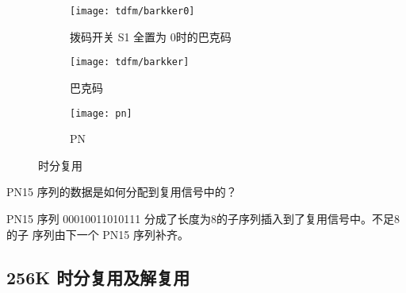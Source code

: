 \documentclass[../main]{subfiles}
\begin{document}
\begin{figure}[htbp]
  \centering
  \begin{subfigure}[htbp]{0.45\linewidth}
    \centering
    \texttt{[image: tdfm/barkker0]}
    \caption{拨码开关 S1 全置为 0时的巴克码}%
    \label{fig:tdfm/barkker0}
  \end{subfigure}
  \quad
  \begin{subfigure}[htbp]{0.45\linewidth}
    \centering
    \texttt{[image: tdfm/barkker]}
    \caption{巴克码}%
    \label{fig:tdfm/barkker}
  \end{subfigure}

  \begin{subfigure}[htbp]{0.45\linewidth}
    \centering
    \texttt{[image: pn]}
    \caption{PN}%
    \label{fig:pn}
  \end{subfigure}
  \caption{时分复用}%
  \label{fig:tdfm}
\end{figure}

\begin{Exercise}[title = 思考]
  PN15 序列的数据是如何分配到复用信号中的？
\end{Exercise}

\begin{Answer}
  PN15 序列 00010011010111 分成了长度为8的子序列插入到了复用信号中。不足8的子
  序列由下一个 PN15 序列补齐。
\end{Answer}

\subsection{256K 时分复用及解复用}%
\label{sub:256k}


\end{document}
